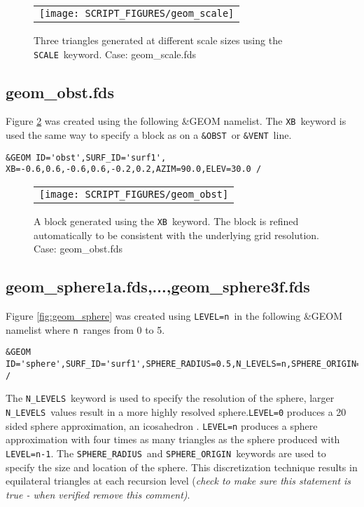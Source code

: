 \documentclass[12pt]{article}
\begin{document}
\begin{figure}[\figoptions]
\begin{center}
\begin{tabular}{c}
 \texttt{[image: SCRIPT\_FIGURES/geom\_scale]}
  \end{tabular}
\end{center}
\caption{Three triangles generated at different scale sizes using the {\tt SCALE}\ keyword. Case: geom\_scale.fds}
\label{fig:geom_scale}
\end{figure}

\subsection{geom\_obst.fds}
Figure \ref{fig:geom_obst} was created using the following \&GEOM namelist.
The {\tt XB}\ keyword is used the same way to specify a block as on
a {\tt \&OBST}\ or {\tt \&VENT}\ line.

{\scriptsize
\begin{verbatim}
&GEOM ID='obst',SURF_ID='surf1', XB=-0.6,0.6,-0.6,0.6,-0.2,0.2,AZIM=90.0,ELEV=30.0 /
\end{verbatim}
}

\begin{figure}[\figoptions]
\begin{center}
\begin{tabular}{c}
 \texttt{[image: SCRIPT\_FIGURES/geom\_obst]}
  \end{tabular}
\end{center}
 \caption{A block generated using the {\tt XB}\ keyword.  The block is refined automatically to be consistent with the underlying grid resolution. Case: geom\_obst.fds}
\label{fig:geom_obst}
\end{figure}

\subsection{geom\_sphere1a.fds,...,geom\_sphere3f.fds}
Figure \ref{fig:geom_sphere} was created using {\tt LEVEL=n}\
in the following \&GEOM namelist
where {\tt n}\ ranges from 0 to 5.

{\scriptsize
\begin{verbatim}
&GEOM ID='sphere',SURF_ID='surf1',SPHERE_RADIUS=0.5,N_LEVELS=n,SPHERE_ORIGIN=0.0,0.0,0.0 /
\end{verbatim}
}

The {\tt N\_LEVELS}\ keyword is used
to specify the resolution of the sphere, larger {\tt N\_LEVELS}\ values result
in a more highly resolved sphere.{\tt LEVEL=0} produces a 20 sided sphere approximation, an icosahedron .
{\tt LEVEL=n} produces a sphere approximation with four times as many triangles as the
sphere produced with {\tt LEVEL=n-1}.
The {\tt SPHERE\_RADIUS}\ and {\tt SPHERE\_ORIGIN}\ keywords are used to specify
the size and location of the sphere.  This discretization technique results in equilateral triangles at each recursion level {(\em check to make sure this statement is true - when verified remove this comment)}.
\end{document}
